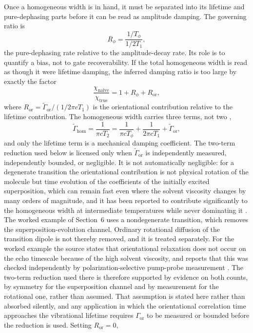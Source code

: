 Once a homogeneous width is in hand, it must be separated into its lifetime and pure-dephasing parts before it can be read as amplitude damping. The governing ratio is
\begin{equation}
R_\phi = \frac{1/T_\phi}{1/2T_1},
\end{equation}
the pure-dephasing rate relative to the amplitude-decay rate. Its role is to quantify a bias, not to gate recoverability. If the total homogeneous width is read as though it were lifetime damping, the inferred damping ratio is too large by exactly the factor
\begin{equation}
\frac{\chi_{\mathrm{naive}}}{\chi_{\mathrm{true}}} = 1 + R_\phi + R_{\mathrm{or}},
\end{equation}
where $R_{\mathrm{or}} = \widetilde{\Gamma}_{\mathrm{or}}/(1/2\pi c T_1)$ is the orientational contribution relative to the lifetime contribution. The homogeneous width carries three terms, not two \citep{tokmakoff1995},
\[
\widetilde{\Gamma}_{\mathrm{hom}} = \frac{1}{\pi c T_2} = \frac{1}{\pi c T_\phi} + \frac{1}{2\pi c T_1} + \widetilde{\Gamma}_{\mathrm{or}},
\]
and only the lifetime term is a mechanical damping coefficient. The two-term reduction used below is licensed only when $\widetilde{\Gamma}_{\mathrm{or}}$ is independently measured, independently bounded, or negligible. It is not automatically negligible: for a degenerate transition the orientational contribution is not physical rotation of the molecule but time evolution of the coefficients of the initially excited superposition, which can remain fast even where the solvent viscosity changes by many orders of magnitude, and it has been reported to contribute significantly to the homogeneous width at intermediate temperatures while never dominating it \citep{tokmakoff1995}. The worked example of Section~6 uses a nondegenerate transition, which removes the superposition-evolution channel. Ordinary rotational diffusion of the transition dipole is not thereby removed, and it is treated separately. For the worked example the source states that orientational relaxation does not occur on the echo timescale because of the high solvent viscosity, and reports that this was checked independently by polarization-selective pump-probe measurement \citep{rectorfayer}. The two-term reduction used there is therefore supported by evidence on both counts, by symmetry for the superposition channel and by measurement for the rotational one, rather than assumed. That assumption is stated here rather than absorbed silently, and any application in which the orientational correlation time approaches the vibrational lifetime requires \(\Gamma_{\mathrm{or}}\) to be measured or bounded before the reduction is used. Setting $R_{\mathrm{or}} = 0$,
